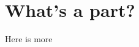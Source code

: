 \documentclass[11pt,notitlepage]{isuthesis}
\author{\theAuthor}
\title{\titleWithLineBreak}
\begin{document}
\tableofcontents
\part{What's a part?}
Here is more
\clearpage
\pagebreak
\end{document}
